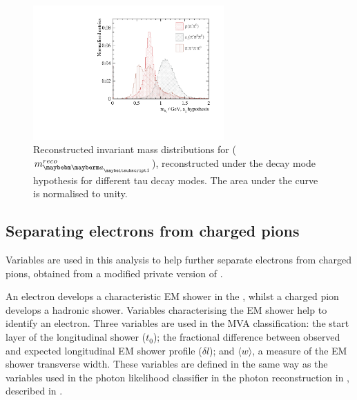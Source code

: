 \begin{figure}[htbp]
\centering
 \includegraphics[width=0.65\textwidth]{tau/var3/mA1A1Fit_100GeV_improved_zoom.pdf}
\caption
{Reconstructed invariant mass distributions for \Pai ($m^{reco}_{\Pai}$), reconstructed under the  \decayAiPhotonShort decay mode hypothesis for different tau decay modes. The area under the curve is normalised to unity.}
\label{fig:tauVarMA1}
\end{figure}

\subsection{Separating electrons from charged pions}
\label{sec:tauVarEPiSeparation}

Variables are used in this analysis to help further separate  electrons from charged pions, obtained from a modified private version of \pandora.



An electron develops a characteristic EM shower in the \ECAL, whilst a charged pion develops a hadronic shower. Variables characterising the  EM shower help to identify an electron. Three variables are used in the MVA classification: the start layer of the longitudinal shower ($t_0$); the fractional difference between observed and expected longitudinal EM shower profile ($\delta{l}$); and $\langle{w}\rangle$, a measure of the EM shower transverse width. These variables are defined in the same way as the variables used in the photon likelihood classifier in the photon reconstruction in \pandora, described in .

